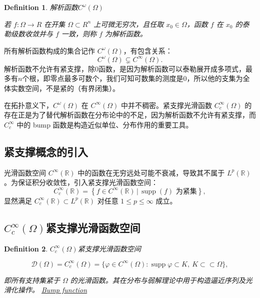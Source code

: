 \documentclass[linespread=1.5,openany]{book}%
\def\R{R}%
\theoremstyle{plain}
\newtheorem{definition}{Definition}
\newcommand{\R}{\mathbb{R}}                %
\DeclareMathOperator{\supp}{supp}           %
\begin{document}
{{{{{{{{										\begin{definition}解析函数$C^\omega(\Omega)$
											
											若 $f:\Omega\to\R$ 在开集 $\Omega\subset\R^n$ 上可微无穷次，且任取 $x_0\in\Omega$，函数 $f$ 在 $x_0$ 的泰勒级数收敛并与 $f$ 一致，则称 $f$ 为解析函数。
										\end{definition}
										
										所有解析函数构成的集合记作 $C^\omega(\Omega)$，有包含关系：
										\[
										C^\omega(\Omega)\subsetneq C^\infty(\Omega).
										\]
										解析函数不允许有紧支撑，除0函数，是因为解析函数可以泰勒展开成多项式，最多有$n$个根，即零点最多可数个，我们可知可数集的测度是0，所以他的支集为全体实数空间，不是紧的（有界闭集）。
										
										在拓扑意义下，$C^\omega(\Omega)$ 在 $C^\infty(\Omega)$ 中并不稠密。紧支撑光滑函数 $C_c^\infty(\Omega)$ 的存在正是为了替代解析函数在分布论中的不足，因为解析函数不允许有紧支撑，而 $C_c^\infty$ 中的 bump 函数是构造近似单位、分布作用的重要工具。
										
										
										
										
										\subsection{紧支撑概念的引入}
										光滑函数空间 $C^\infty(\mathbb{R})$ 中的函数在无穷远处可能不衰减，导致其不属于 $L^p(\mathbb{R})$。为保证积分收敛性，引入紧支撑光滑函数空间：
										\[
										C_c^\infty(\mathbb{R}) = \left\{ f \in C^\infty(\mathbb{R}) \,\big|\, \supp(f) \text{ 为紧集} \right\},
										\]
										显然满足 $C_c^\infty(\mathbb{R}) \subset L^p(\mathbb{R})$ 对任意 $1 \leq p \leq \infty$ 成立。
										\subsection{\texorpdfstring{$C_c^\infty(\Omega)$}{Cc∞}紧支撑光滑函数空间}
										
										\begin{definition}$C_c^\infty(\Omega)$紧支撑光滑函数空间
											
											\[
											\mathcal D(\Omega)=	C_c^\infty(\Omega)
											=\{\varphi\in C^\infty(\Omega):\supp\varphi\subset K,\ K\subset\subset\Omega\},
											\]
											
											
											即所有支持集紧于 $\Omega$ 的光滑函数。其在分布与弱解理论中用于构造逼近序列及光滑化操作。
											\href{https://en.wikipedia.org/wiki/Bump_function}{Bump function}
										\end{definition}
										
}}}}}}}}
\end{document}
